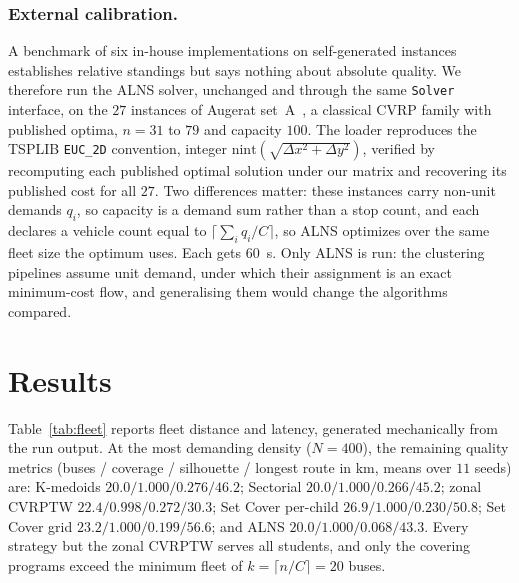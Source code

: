 \documentclass[graybox]{SNmult}
\begin{document}
\subsubsection{External calibration.}\label{sec:external}
A benchmark of six in-house implementations on self-generated instances
establishes relative standings but says nothing about absolute quality. We
therefore run the ALNS solver, unchanged and through the same
\texttt{Solver} interface, on the $27$ instances of Augerat
set~A~\cite{Augerat1995CVRP}, a classical CVRP family with published
optima, $n=31$ to $79$ and capacity $100$. The loader reproduces the
TSPLIB \texttt{EUC\_2D} convention, integer
$\mathrm{nint}(\sqrt{\Delta x^2+\Delta y^2})$, verified by recomputing
each published optimal solution under our matrix and recovering its
published cost for all $27$. Two differences matter: these instances carry non-unit demands $q_i$, so
capacity is a demand sum rather than a stop count, and each declares a
vehicle count equal to $\lceil \sum_i q_i / C\rceil$, so ALNS optimizes
over the same fleet size the optimum uses. Each gets $60$~s. Only ALNS is
run: the clustering pipelines assume unit demand, under which their
assignment is an exact minimum-cost flow, and generalising them would
change the algorithms compared.

\section{Results}\label{sec:results}
Table~\ref{tab:fleet} reports fleet distance and latency, generated
mechanically from the run output. At the most demanding density
($N=400$), the remaining quality metrics (buses / coverage / silhouette /
longest route in km, means over $11$ seeds) are: K-medoids
$20.0/1.000/0.276/46.2$; Sectorial $20.0/1.000/0.266/45.2$; zonal CVRPTW
$22.4/0.998/0.272/30.3$; Set Cover per-child $26.9/1.000/0.230/50.8$; Set
Cover grid $23.2/1.000/0.199/56.6$; and ALNS $20.0/1.000/0.068/43.3$.
Every strategy but the zonal CVRPTW serves all students, and only the
covering programs exceed the minimum fleet of $k=\lceil n/C\rceil=20$
buses.
\end{document}
